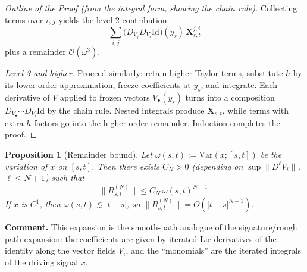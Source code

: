 \documentclass[12pt]{article}
\newtheorem{proposition}[theorem]{Proposition}
\begin{document}
\begin{proof}[Outline of the Proof (from the integral form, showing the chain rule)]
\smallskip
Collecting terms over $i,j$ yields the level-2 contribution
\[
\sum_{i,j} 
   \big(D_{V_j}D_{V_i}\mathrm{Id}\big)(y_s)\,\mathbf X^{j,i}_{s,t}
\]
plus a remainder $\mathcal O(\omega^3)$.

\medskip
\emph{Level 3 and higher.}  
Proceed similarly:  
retain higher Taylor terms, substitute $h$ by its lower-order approximation, freeze coefficients at $y_s$, and integrate.  
Each derivative of $V$ applied to frozen vectors $V_\bullet(y_s)$ turns into a composition $D_{V_\bullet}\cdots D_{V_i}\mathrm{Id}$ by the chain rule.  
Nested integrals produce $\mathbf X^{\cdot}_{s,t}$, while terms with extra $h$ factors go into the higher-order remainder.  
Induction completes the proof.
\end{proof}


\begin{proposition}[Remainder bound]
Let $\omega(s,t) := \mathrm{Var}(x;[s,t])$ be the variation of $x$ on $[s,t]$.
Then there exists $C_N>0$ (depending on $\sup\|D^\ell V_i\|$, $\ell\le N+1$) such that
\[
\|R^{(N)}_{s,t}\| \le C_N \ \omega(s,t)^{N+1}.
\]
If $x$ is $C^1$, then $\omega(s,t) \lesssim |t-s|$, so $\|R^{(N)}_{s,t}\| = O(|t-s|^{N+1})$.
\end{proposition}

\medskip
\noindent\textbf{Comment.} This expansion is the smooth-path analogue of the signature/rough path expansion: the coefficients are given by iterated Lie derivatives of the identity along the vector fields $V_i$, and the ``monomials'' are the iterated integrals of the driving signal $x$.
\end{document}
